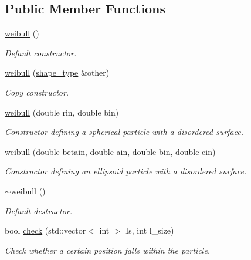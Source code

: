 \subsection*{Public Member Functions}
\begin{DoxyCompactItemize}
\item 
\hyperlink{classparticle_1_1weibull_a413758e18402783bd5ce45442a11abf7}{weibull} ()
\begin{DoxyCompactList}\small\item\em Default constructor. \end{DoxyCompactList}\item 
\hyperlink{classparticle_1_1weibull_a1e577588fad6c6cba195b35471379829}{weibull} (\hyperlink{classparticle_1_1shape__type}{shape\+\_\+type} \&other)
\begin{DoxyCompactList}\small\item\em Copy constructor. \end{DoxyCompactList}\item 
\hyperlink{classparticle_1_1weibull_acc2cb2aaae6d24b6c3fa5063df22fc30}{weibull} (double rin, double bin)
\begin{DoxyCompactList}\small\item\em Constructor defining a spherical particle with a disordered surface. \end{DoxyCompactList}\item 
\hyperlink{classparticle_1_1weibull_aba07cb554058f96b85ee83e587c2700a}{weibull} (double betain, double ain, double bin, double cin)
\begin{DoxyCompactList}\small\item\em Constructor defining an ellipsoid particle with a disordered surface. \end{DoxyCompactList}\item 
\hyperlink{classparticle_1_1weibull_af70f6b03e4246912ed6d9aa8ee812b38}{$\sim$weibull} ()
\begin{DoxyCompactList}\small\item\em Default destructor. \end{DoxyCompactList}\item 
bool \hyperlink{classparticle_1_1weibull_a709fba340c053c3bb21710e2d577b1cd}{check} (std\+::vector$<$ int $>$ Is, int l\+\_\+size)
\begin{DoxyCompactList}\small\item\em Check whether a certain position falls within the particle. \end{DoxyCompactList}\item 

\end{DoxyCompactItemize}
